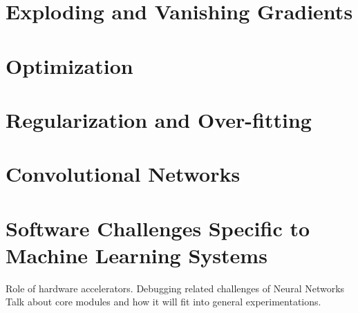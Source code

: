 \section{Exploding and Vanishing Gradients}

\section{Optimization}

\section{Regularization and Over-fitting}

\section{Convolutional Networks}

\section{Software Challenges Specific to 
Machine Learning Systems} \label{sec:engchallenge}
Role of hardware accelerators. Debugging related challenges of Neural Networks
Talk about core modules and how it will fit into general experimentations. 
\clearpage